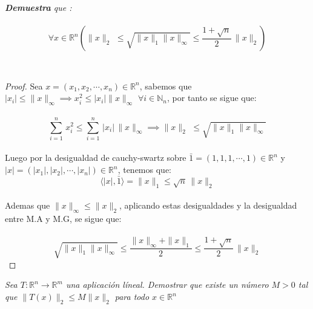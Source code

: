 \documentclass[11pt,letterpaper]{article}
\newcommand{\R}{\mathbb{R}}
\newcommand{\N}{\mathbb{N}}
\begin{document}
\begin{tcolorbox}[
	title = \textcolor{black}{\textcolor{white}{Problema 3}}]
\textit{\textbf{Demuestra} que :\,\\
\,\\
\begin{equation*}
    \forall x\in \R^n \left(\|x\|_2\,\,\leq\sqrt{\|x\|_1 \|x\|_{\infty}}\leq \frac{1+\sqrt{n}}{2}\,\|x\|_2\right)
\end{equation*}
}
\end{tcolorbox}\,\\
\begin{proof}
    Sea $x=(x_1,x_2,\cdots,x_n)\in \R^n$, sabemos que $|x_i|\leq \|x\|_{\infty}\implies x_i^2\leq |x_i| \|x\|_{\infty}$ $\forall i\in \N_n$, por tanto se sigue que:\,\\
    \,\\
    \begin{equation*}
        \sum_{i=1}^n\,x_i^2\leq\sum_{i=1}^n\,|x_i|\,\|x\|_{\infty}\implies \|x\|_2\,\,\leq \sqrt{\|x\|_1 \|x\|_{\infty}}
    \end{equation*}\,\\
    Luego por la desigualdad de cauchy-swartz sobre $\bar{1}=(1,1,1,\cdots,1)\in \R^n$ y \\ $|x|=(|x_1|,|x_2|,\cdots,|x_n|)\in \R^n$, tenemos que:\,\\
    \begin{equation*}
        \langle|x|,\bar{1}\rangle=\|x\|_1\leq \sqrt{n}\,\|x\|_2
    \end{equation*}\,\\
    Ademas que $\|x\|_{\infty}\leq\|x\|_2$, aplicando estas desigualdades y la desigualdad entre M.A y M.G, se sigue que:\,\\
    \,\\
    \begin{equation*}
        \sqrt{\|x\|_1 \|x\|_{\infty}}\leq \frac{\|x\|_{\infty} +\|x\|_{1}}{2}\leq \frac{1+\sqrt{n}}{2}\,\|x\|_2
    \end{equation*}
\end{proof}
\begin{tcolorbox}[
	title = \textcolor{black}{\textcolor{white}{Problema 4}}]
\textit{Sea $T:\R^n\rightarrow \R^m$ una aplicaci\'on l\'ineal. Demostrar que existe un n\'umero $M>0$ tal que $\|T(x)\|_2\leq M\|x\|_2$ para todo $x\in \R^n$
}
\end{tcolorbox}
\end{document}
